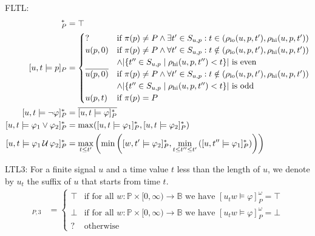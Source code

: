 \documentclass[envcountsame, runningheads]{llncs}
\newcommand{\B}{\mathbb{B}}
\def\until{\,\mathcal{U}\,}
\def\since{\,\mathcal{S}\,}
\newcommand{\?}{\text{?}}
\newcommand{\suchthat}{\;\ifnum\currentgrouptype=16 \middle\fi|\;}
\let\st\suchthat
\begin{document}
	FLTL:
	\begin{align*}
		[u,t \models \texttt{true}]_P^* &= \top \\
		[u,t \models p]_P &= \begin{cases}
			? &\text{if } \pi(p) \not = P \land \exists t' \in S_{u,p} : t \in (\rho_{\text{lo}}(u, p, t'), \rho_{\text{hi}}(u, p, t')) \\
			u(p,0) &\text{if } \pi(p) \not = P \land \forall t' \in S_{u,p} : t \notin (\rho_{\text{lo}}(u, p, t'), \rho_{\text{hi}}(u, p, t')) \\
			&\land |\{t'' \in S_{u,p} \st \rho_{\text{hi}}(u, p, t'') < t\}| \text{ is even} \\
			\overline{u(p,0)} &\text{if } \pi(p) \not = P \land \forall t' \in S_{u,p} : t \notin (\rho_{\text{lo}}(u, p, t'), \rho_{\text{hi}}(u, p, t')) \\
			&\land |\{t'' \in S_{u,p} \st \rho_{\text{hi}}(u, p, t'') < t\}| \text{ is odd} \\
			u(p,t) &\text{if } \pi(p) = P \\
		\end{cases} \\
		[u,t \models \lnot \varphi]_P^* &= \overline{[u,t \models \varphi]_P^*}\\
		[u,t \models \varphi_1 \lor \varphi_2]_P^* &= \max([u,t \models \varphi_1]_P^*, [u,t \models \varphi_2]_P^*)\\
		[u,t \models \varphi_1 \until \varphi_2]_P^* &= \max_{t \leq t'} \left( \min \left( [w,t' \models \varphi_2]_P^*, \min_{t \leq t'' \leq t'} \left( [u,t'' \models \varphi_1]_P^* \right) \right) \right)\\
	\end{align*}
	
	LTL3: For a finite signal $u$ and a time value $t$ less than the length of $u$, we denote by $u_t$ the suffix of $u$ that starts from time $t$.
	\begin{align*}
		[u,t \models \varphi]_{P,3} &= \begin{cases}
			\top &\text{if for all }  w : \mathbb{P} \times [0, \infty) \to \B  \text{ we have } [u_t w \models \varphi]_P^\omega = \top \\
			\bot &\text{if for all }  w : \mathbb{P} \times [0, \infty) \to \B  \text{ we have } [u_t w \models \varphi]_P^\omega = \bot \\
			? &\text{otherwise}
		\end{cases}
	\end{align*}
	
\end{document}
